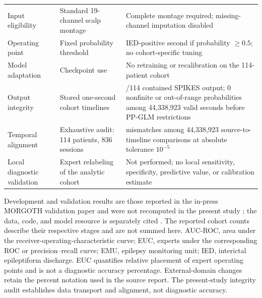 \documentclass[11pt]{article}
\begin{document}
\begin{table}[H]
\begin{tabularx}{0.96\textwidth}{@{}p{}p{}>{\raggedright\arraybackslash}X@{}}
Input eligibility & Standard 19-channel scalp montage & Complete montage required; missing-channel imputation disabled \\
Operating point & Fixed probability threshold & IED-positive second if probability $\geq0.5$; no cohort-specific tuning \\
Model adaptation & Checkpoint use & No retraining or recalibration on the 114-patient cohort \\
Output integrity & Stored one-second cohort timelines & 114/114 contained SPIKES output; 0 nonfinite or out-of-range probabilities among 44,338,923 valid seconds before PP-GLM restrictions \\
Temporal alignment & Exhaustive audit: 114 patients, 836 sessions & 0 mismatches among 44,338,923 source-to-timeline comparisons at absolute tolerance $10^{-5}$ \\
Local diagnostic validation & Expert relabeling of the analytic cohort & Not performed; no local sensitivity, specificity, predictive value, or calibration estimate \\
\bottomrule
\end{tabularx}
\vspace{0.4em}
\begin{minipage}{0.96\textwidth}\scriptsize
Development and validation results are those reported in the in-press MORGOTH validation paper and were not recomputed in the present study \cite{MORGOTHValidation2026}; the data, code, and model resource is separately cited \cite{MORGOTH2026}. The reported cohort counts describe their respective stages and are not summed here. AUC-ROC, area under the receiver-operating-characteristic curve; EUC, experts under the corresponding ROC or precision--recall curve; EMU, epilepsy monitoring unit; IED, interictal epileptiform discharge. EUC quantifies relative placement of expert operating points and is not a diagnostic accuracy percentage. External-domain changes retain the percent notation used in the source report. The present-study integrity audit establishes data transport and alignment, not diagnostic accuracy.
\end{minipage}
\end{table}
\end{document}
